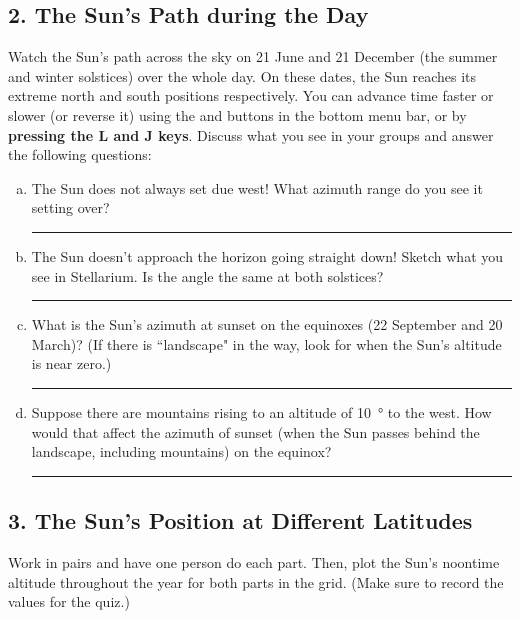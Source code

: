 \documentclass[main.tex]{subfiles}
\begin{document}
\subsection*{2. The Sun's Path during the Day}
Watch the Sun's path across the sky on 21 June and 21 December (the summer and winter solstices) over the whole day. On these dates, the Sun reaches its extreme north and south positions respectively. You can advance time faster or slower (or reverse it) using the and buttons in the bottom menu bar, or by \textbf{pressing the L and J keys}. Discuss what you see in your groups and answer the following questions:
\begin{enumerate}[a.]
\item The Sun does not always set due west! What azimuth range do you see it setting over?\\

\rule{15cm}{.2mm}

\item The Sun doesn't approach the horizon going straight down! Sketch what you see in Stellarium. Is the angle the same at both solstices?\\

\rule{15cm}{.2mm}

\item What is the Sun's azimuth at sunset on the equinoxes (22 September and 20 March)? (If there is ``landscape" in the way, look for when the Sun's altitude is near zero.)\\

\rule{15cm}{.2mm}

\item Suppose there are mountains rising to an altitude of \SI{10}{\degree} to the west. How would that affect the azimuth of sunset (when the Sun passes behind the landscape, including mountains) on the equinox?\\

\rule{15cm}{.2mm}

\end{enumerate}

\subsection*{3. The Sun's Position at Different Latitudes}
Work in pairs and have one person do each part. Then, plot the Sun's noontime altitude throughout the year for both parts in the grid. (Make sure to record the values for the quiz.)
\end{document}
